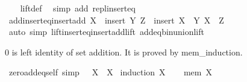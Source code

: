 \begin{isabellebody}
%
\isadelimproof
\ \ %
\endisadelimproof
%
\isatagproof
{}\isamarkupfalse%
\ lift{\isacharunderscore}{\kern0pt}def\ \isamarkupfalse%
\ {\isacharparenleft}{\kern0pt}simp\ add{\isacharcolon}{\kern0pt}\ repl{\isacharunderscore}{\kern0pt}insert{\isacharunderscore}{\kern0pt}eq{\isacharparenright}{\kern0pt}%
\endisatagproof
{\isafoldproof}%
%
\isadelimproof
\isanewline
%
\endisadelimproof
\isanewline
{}\isamarkupfalse%
\ add{\isacharunderscore}{\kern0pt}insert{\isacharunderscore}{\kern0pt}eq{\isacharunderscore}{\kern0pt}insert{\isacharunderscore}{\kern0pt}add{\isacharcolon}{\kern0pt}\ {\isachardoublequoteopen}X\ {\isacharplus}{\kern0pt}\ insert\ Y\ Z\ {\isacharequal}{\kern0pt}\ insert\ {\isacharparenleft}{\kern0pt}X\ {\isacharplus}{\kern0pt}\ Y{\isacharparenright}{\kern0pt}\ {\isacharparenleft}{\kern0pt}X\ {\isacharplus}{\kern0pt}\ Z{\isacharparenright}{\kern0pt}{\isachardoublequoteclose}\isanewline
%
\isadelimproof
\ \ %
\endisadelimproof
%
\isatagproof
{}\isamarkupfalse%
\ {\isacharparenleft}{\kern0pt}auto\ simp{\isacharcolon}{\kern0pt}\ lift{\isacharunderscore}{\kern0pt}insert{\isacharunderscore}{\kern0pt}eq{\isacharunderscore}{\kern0pt}insert{\isacharunderscore}{\kern0pt}add{\isacharunderscore}{\kern0pt}lift\ add{\isacharunderscore}{\kern0pt}eq{\isacharunderscore}{\kern0pt}bin{\isacharunderscore}{\kern0pt}union{\isacharunderscore}{\kern0pt}lift{\isacharparenright}{\kern0pt}%
\endisatagproof
{\isafoldproof}%
%
\isadelimproof
%
\endisadelimproof
%
\isadelimdocument
%
\endisadelimdocument
%
\isatagdocument
%
\isamarkuptrue%
%
\endisatagdocument
{\isafolddocument}%
%
\isadelimdocument
%
\endisadelimdocument
%
\begin{isamarkuptext}%
0 is left identity of set addition. It is proved by mem\_induction.%
\end{isamarkuptext}\isamarkuptrue%
\isamarkupfalse%
\ zero{\isacharunderscore}{\kern0pt}add{\isacharunderscore}{\kern0pt}eq{\isacharunderscore}{\kern0pt}self\ {\isacharbrackleft}{\kern0pt}simp{\isacharbrackright}{\kern0pt}{\isacharcolon}{\kern0pt}\ {\isachardoublequoteopen}{}\ {\isacharplus}{\kern0pt}\ X\ {\isacharequal}{\kern0pt}\ X{\isachardoublequoteclose}\isanewline
%
\isadelimproof
%
\endisadelimproof
%
\isatagproof
{}\isamarkupfalse%
\ {\isacharparenleft}{\kern0pt}induction\ X{\isacharparenright}{\kern0pt}\isanewline
\ \ \isamarkupfalse%
\ {\isacharparenleft}{\kern0pt}mem\ X{\isacharparenright}{\kern0pt}\isanewline

\end{isabellebody}
